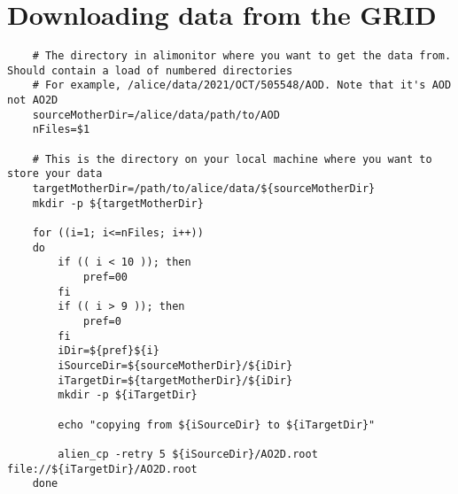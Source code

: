 \section{Downloading data from the GRID}\label{apx:Downloading_Data}
\begin{verbatim}
    # The directory in alimonitor where you want to get the data from. Should contain a load of numbered directories
    # For example, /alice/data/2021/OCT/505548/AOD. Note that it's AOD not AO2D
    sourceMotherDir=/alice/data/path/to/AOD
    nFiles=$1

    # This is the directory on your local machine where you want to store your data
    targetMotherDir=/path/to/alice/data/${sourceMotherDir}
    mkdir -p ${targetMotherDir}

    for ((i=1; i<=nFiles; i++))
    do
        if (( i < 10 )); then
            pref=00
        fi
        if (( i > 9 )); then
            pref=0
        fi
        iDir=${pref}${i}
        iSourceDir=${sourceMotherDir}/${iDir}
        iTargetDir=${targetMotherDir}/${iDir}
        mkdir -p ${iTargetDir}

        echo "copying from ${iSourceDir} to ${iTargetDir}" 
        
        alien_cp -retry 5 ${iSourceDir}/AO2D.root file://${iTargetDir}/AO2D.root
    done
\end{verbatim}
